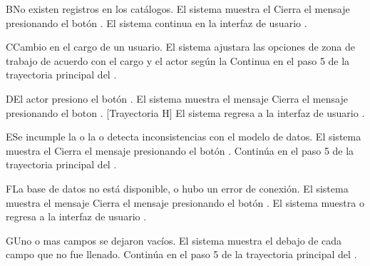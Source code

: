 \begin{UCtrayectoriaA}{B}{No existen registros en los catálogos.}
	\UCpaso     El sistema muestra el 
	\UCpaso[\UCactor] Cierra el mensaje presionando el botón .
	\UCpaso El sistema continua en la interfaz de usuario .
\end{UCtrayectoriaA}

\begin{UCtrayectoriaA}{C}{Cambio en el cargo de un usuario.}
	\UCpaso     El sistema ajustara las opciones de zona de trabajo de acuerdo con el cargo y el actor según la 
	\UCpaso     Continua en el paso 5 de la trayectoria principal del .
\end{UCtrayectoriaA}


\begin{UCtrayectoriaA}{D}{El actor presiono el botón .}
	\UCpaso El sistema muestra el mensaje 
	\UCpaso[\UCactor] Cierra el mensaje presionando el boton  . [Trayectoria H]
	\UCpaso El sistema regresa a la interfaz de usuario .
\end{UCtrayectoriaA}

\begin{UCtrayectoriaA}{E}{Se incumple la  o la   o detecta inconsistencias con el modelo de datos.}
	\UCpaso El sistema muestra el 
	\UCpaso[\UCactor] Cierra el mensaje presionando el botón .
	\UCpaso Continúa en el paso 5 de la trayectoria principal del .
\end{UCtrayectoriaA}


\begin{UCtrayectoriaA}{F}{La base de datos no está disponible, o hubo un error de conexión.}
	\UCpaso El sistema muestra el mensaje 
	\UCpaso[\UCactor] Cierra el mensaje presionando el botón .
	\UCpaso El sistema muestra o regresa a la interfaz de usuario  .
\end{UCtrayectoriaA}




\begin{UCtrayectoriaA}{G}{Uno o mas campos se dejaron vacíos.}
	\UCpaso El sistema muestra el  debajo de cada campo que no fue llenado. 
	\UCpaso	Continúa en el paso 5 de la trayectoria principal del .
\end{UCtrayectoriaA}